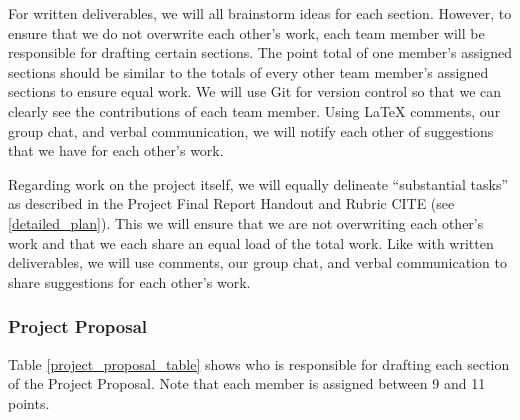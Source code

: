 \documentclass{article} %
\begin{document}
For written deliverables, we will all brainstorm ideas for each section. However, to ensure that we do not overwrite each other's work, each team member will be responsible for drafting certain sections. The point total of one member's assigned sections should be similar to the totals of every other team member's assigned sections to ensure equal work. We will use Git for version control so that we can clearly see the contributions of each team member. Using LaTeX comments, our group chat, and verbal communication, we will notify each other of suggestions that we have for each other's work.

Regarding work on the project itself, we will equally delineate ``substantial tasks'' as described in the Project Final Report Handout and Rubric CITE (see \ref{detailed_plan}). This we will ensure that we are not overwriting each other's work and that we each share an equal load of the total work. Like with written deliverables, we will use comments, our group chat, and verbal communication to share suggestions for each other's work.

\subsubsection{Project Proposal}

Table \ref{project_proposal_table} shows who is responsible for drafting each section of the Project Proposal. Note that each member is assigned between 9 and 11 points.
\end{document}
